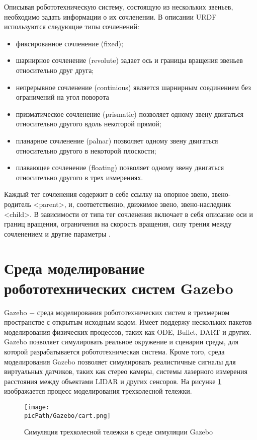 \documentclass[oneside,final,14pt]{extreport}
\newcommand{\picPath}{img}
\newlength{\mylength}
\begin{document}
Описывая робототехническую систему, состоящую из нескольких звеньев, необходимо задать информации о их сочленении. В описании URDF используются следующие типы сочленений:
\begin{itemize}
\item фиксированное сочленение (fixed);
\end{itemize}
\begin{itemize}[leftmargin=\mylength]
\item шарнирное сочленение (revolute) задает ось и границы вращения звеньев относительно друг друга;
\item непрерывное сочленение  (continious) является шарнирным соединением без ограничений на угол поворота
\item призматическое сочленение (prismatic) позволяет одному звену двигаться относительно другого вдоль некоторой прямой;
\item планарное сочленение (palnar) позволяет одному звену двигаться относительно другого в некоторой плоскости;
\item плавающее сочленение (floating) позволяет одному звену двигаться относительно другого в трех измерениях.
\end{itemize} 

Каждый тег сочленения содержит в себе ссылку на опорное звено, звено-родитель <parent>, и, соответственно, движимое звено, звено-наследник <child>.  В зависимости от типа тег сочленения включает в себя описание оси и границ вращения, ограничения на скорость вращения, силу трения между сочленением и другие параметры \cite{ros.org}. 

\section{Среда моделирование робототехнических систем Gazebo}
\label{chap:Gazebo}
Gazebo $-$ среда моделирования робототехнических систем в трехмерном пространстве с открытым исходным кодом. Имеет поддержу нескольких пакетов моделирования физических процессов, таких как ODE, Bullet, DART и других. Gazebo позволяет симулировать реальное окружение и сценарии среды, для которой разрабатывается робототехническая система. Кроме того, среда моделирования Gazebo позволяет симулировать реалистичные сигналы для виртуальных датчиков, таких как стерео камеры, системы лазерного измерения расстояния между объектами LIDAR и других сенсоров.
На рисунке \ref{Figure:gazeboEx} изображается процесс моделирования трехколесной тележки. 

\begin{figure}[H]
\begin{center}
\texttt{[image: \\picPath/Gazebo/cart.png]}
\end{center}
  \caption{ Симуляция трехколесной тележки в среде симуляции Gazebo}
  \label{Figure:gazeboEx}
\end{figure}
\end{document}
